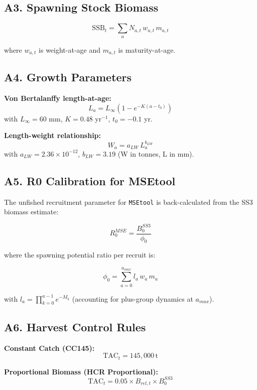 \documentclass[
]{article}
\begin{document}
\hypertarget{a3.-spawning-stock-biomass}{%
\subsection{A3. Spawning Stock Biomass}\label{a3.-spawning-stock-biomass}}

\[\text{SSB}_t = \sum_a N_{a,t} \, w_{a,t} \, m_{a,t}\]

where \(w_{a,t}\) is weight-at-age and \(m_{a,t}\) is maturity-at-age.

\hypertarget{a4.-growth-parameters}{%
\subsection{A4. Growth Parameters}\label{a4.-growth-parameters}}

\textbf{Von Bertalanffy length-at-age:}
\[L_a = L_\infty \left(1 - e^{-K(a - t_0)}\right)\]
with \(L_\infty = 60\) mm, \(K = 0.48\) yr\(^{-1}\), \(t_0 = -0.1\) yr.

\textbf{Length-weight relationship:}
\[W_a = a_{LW} \, L_a^{b_{LW}}\]
with \(a_{LW} = 2.36 \times 10^{-12}\), \(b_{LW} = 3.19\) (W in tonnes, L in mm).

\hypertarget{a5.-r0-calibration-for-msetool}{%
\subsection{A5. R0 Calibration for MSEtool}\label{a5.-r0-calibration-for-msetool}}

The unfished recruitment parameter for \texttt{MSEtool} is back-calculated from the SS3 biomass estimate:

\[R_0^{MSE} = \frac{B_0^{SS3}}{\phi_0}\]

where the spawning potential ratio per recruit is:

\[\phi_0 = \sum_{a=0}^{a_{max}} l_a \, w_a \, m_a\]

with \(l_a = \prod_{k=0}^{a-1} e^{-M_k}\) (accounting for plus-group dynamics at \(a_{max}\)).

\hypertarget{a6.-harvest-control-rules}{%
\subsection{A6. Harvest Control Rules}\label{a6.-harvest-control-rules}}

\textbf{Constant Catch (CC145):}
\[\text{TAC}_t = 145{,}000 \, \text{t}\]

\textbf{Proportional Biomass (HCR Proportional):}
\[\text{TAC}_t = 0.05 \times B_{rel,t} \times B_0^{SS3}\]
\end{document}
